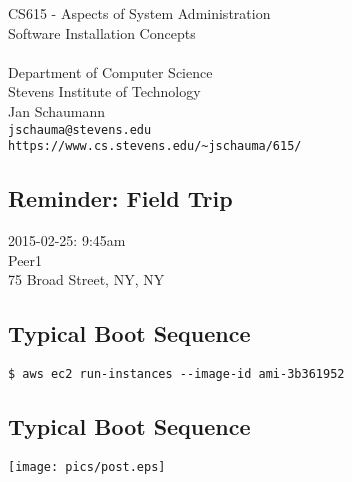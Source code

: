 \documentclass[xga]{xdvislides}
\begin{document}
\setfontphv

\lhead{\slidetitle}                               %
\cfoot{\relax}                               %
\rfoot{\Gray{\today}}

\vspace*{\fill}
\begin{center}
	\Hugesize
		CS615 - Aspects of System Administration\\ [1em]
		Software Installation Concepts \\ [1em]
	\hspace*{5mm}\blueline\\ [1em]
	\Normalsize
		Department of Computer Science\\
		Stevens Institute of Technology\\
		Jan Schaumann\\
		\verb+jschauma@stevens.edu+ \\
		\verb+https://www.cs.stevens.edu/~jschauma/615/+
\end{center}
\vspace*{\fill}

\subsection{Reminder: Field Trip}
\vspace{1in}

\Hugesize

2015-02-25: 9:45am \\

Peer1 \\

75 Broad Street, NY, NY
\Normalsize


\subsection{Typical Boot Sequence}
\vspace*{\fill}
\begin{verbatim}
$ aws ec2 run-instances --image-id ami-3b361952
\end{verbatim}
\vspace*{\fill}

\subsection{Typical Boot Sequence}
\vspace*{\fill}
\begin{center}
	\texttt{[image: pics/post.eps]} \\
\end{center}
\vspace*{\fill}
\end{document}
